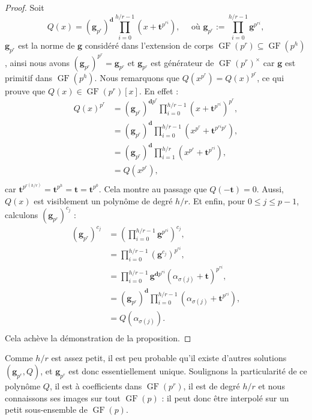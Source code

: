 \documentclass[a4paper, titlepage, 11pt]{article}
\theoremstyle{definition}
\theoremstyle{remark}
\def\gf{\operatorname{GF}}
\def\mbf#1{\mathbf{#1}}
\begin{document}
\begin{proof}
Soit 
$$Q(x) = (\mbf g_{p^r})^{\mbf d} \prod_{i=0}^{h/r-1} \left(x+\mbf t^{p^{ri}}\right),
\quad \text{ où } \mbf g_{p^r} := \prod_{i=0}^{h/r-1} \mbf g^{p^{ri}},$$
$\mbf g_{p^r}$ est la norme de $\mbf g$ considéré dans l'extension de corps $\gf(p^r) \subseteq \gf(p^h)$, ainsi nous avons $(\mbf g_{p^r})^{p^r} = \mbf g_{p^r}$ et $\mbf g_{p^r}$ est générateur de $\gf(p^r)^\times$ car $\mbf g$ est primitif dans $\gf(p^h)$. Nous remarquons que $Q\left(x^{p^r}\right) = Q(x)^{p^r}$, ce qui prouve que $Q(x) \in \gf(p^r)[x]$. En effet :
\begin{align*}
Q\left(x\right)^{p^r} &= (\mbf g_{p^r})^{\mbf dp^r} \prod_{i=0}^{h/r-1} \left(x+\mbf t^{p^{ri}}\right)^{p^r}, \\
&= (\mbf g_{p^r})^{\mbf d} \prod_{i=0}^{h/r-1} \left(x^{p^r} + \mbf t^{p^{ri}p^r}\right), \\
&= (\mbf g_{p^r})^{\mbf d} \prod_{i=1}^{h/r} \left(x^{p^r} + \mbf t^{p^{ri}}\right), \\
&= Q\left(x^{p^r}\right), \\
\end{align*}
car $\mbf t^{p^{r(h/r)}} = \mbf t^{p^h} = \mbf t = \mbf t^{p^0}$. Cela montre au passage que $Q(-\mbf t) = 0$. Aussi, $Q(x)$ est visiblement un polynôme de degré $h/r$. Et enfin, pour $0\leqslant j \leqslant p-1$, calculons $(\mbf g_{p^r})^{c_j}$ :
\begin{align*}
(\mbf g_{p^r})^{c_j} &= \left(\prod_{i=0}^{h/r-1} \mbf g^{p^{ri}}\right)^{c_j},\\
&= \prod_{i=0}^{h/r-1} \left(\mbf g^{c_j}\right)^{p^{ri}}, \\
&= \prod_{i=0}^{h/r-1} \mbf g^{\mbf dp^{ri}}\left(\alpha_{\sigma(j)} + \mbf t\right)^{p^{ri}},\\
&= (\mbf g_{p^r})^{\mbf d} \prod_{i=0}^{h/r-1} \left(\alpha_{\sigma(j)} + \mbf t^{p^{ri}}\right),\\
&= Q\left(\alpha_{\sigma(j)}\right). \\
\end{align*}
Cela achève la démonstration de la proposition.
\end{proof}

Comme $h/r$ est assez petit, il est peu probable qu'il existe d'autres solutions $(\mbf g_{p^r}, Q)$, et $\mbf g_{p^r}$ est donc essentiellement unique. Soulignons la particularité de ce polynôme $Q$, il est à coefficients dans $\gf(p^r)$, il est de degré $h/r$ et nous connaissons ses images sur tout $\gf(p)$ : il peut donc être interpolé sur un petit sous-ensemble de $\gf(p)$.
\end{document}
